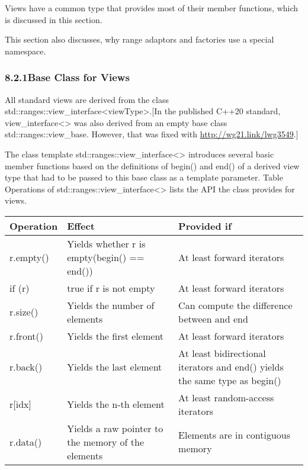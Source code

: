 
Views have a common type that provides most of their member functions, which is discussed in this section.

This section also discusses, why range adaptors and factories use a special namespace.

\subsubsection*{ 8.2.1\hspace{0.2cm}Base Class for Views}

All standard views are derived from the class std::ranges::view\_interface<viewType>.[In the published C++20 standard, view\_interface<> was also derived from an empty base class std::ranges::view\_base. However, that was fixed with \url{http://wg21.link/lwg3549}.]

The class template std::ranges::view\_interface<> introduces several basic member functions based on the definitions of begin() and end() of a derived view type that had to be passed to this base class as a template parameter. Table Operations of std::ranges::view\_interface<> lists the API the class provides for views.

\begin{table}[H]
\centering
\begin{tabular}{|l|l|l|}
	\hline
	\textbf{Operation} & \textbf{Effect}                             & \textbf{Provided if}                       \\ \hline
	r.empty()          & Yields whether r is empty(begin() == end()) & At least forward iterators                 \\ \hline
	if (r)             & true if r is not empty                      & At least forward iterators                 \\ \hline
	r.size()           & Yields the number of elements               & Can compute the difference between and end \\ \hline
	r.front()          & Yields the first element                    & At least forward iterators                 \\ \hline
	r.back() & Yields the last element                            & At least bidirectional iterators and end() yields the same type as begin() \\ \hline
	r{[}idx{]}         & Yields the n-th element                     & At least random-access iterators           \\ \hline
	r.data() & Yields a raw pointer to the memory of the elements & Elements are in contiguous memory                                          \\ \hline
\end{tabular}
\end{table}


